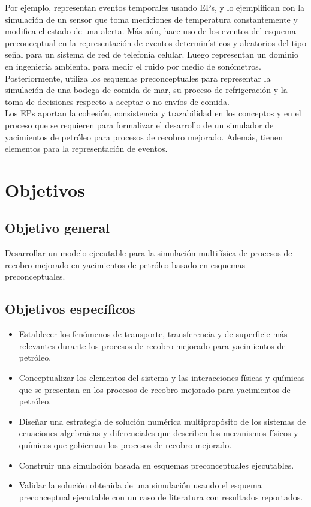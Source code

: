 Por ejemplo, \cite{norena2018timrep} representan eventos temporales usando EPs, y lo ejemplifican con la simulación de un sensor que toma mediciones de temperatura constantemente y modifica el estado de una alerta. Más aún, \cite{norena2018det} hace uso de los eventos del esquema preconceptual en la representación de eventos determinísticos y aleatorios del tipo señal para un sistema de red de telefonía celular. Luego \cite{norena2018ruido} representan un dominio en ingeniería ambiental para medir el ruido por medio de sonómetros. Posteriormente, \cite{norena2018bs} utiliza los esquemas preconceptuales para representar la simulación de una bodega de comida de mar, su proceso de refrigeración y la toma de decisiones respecto a aceptar o no envíos de comida.\\

Los EPs aportan la cohesión, consistencia y trazabilidad en los conceptos y en el proceso que se requieren para formalizar el desarrollo de un simulador de yacimientos de petróleo para procesos de recobro mejorado. Además, tienen elementos para la representación de eventos. %

\section{Objetivos}
\subsection{Objetivo general}
Desarrollar un modelo ejecutable para la simulación multifísica de procesos de recobro mejorado en yacimientos de petróleo basado en esquemas preconceptuales.
\subsection{Objetivos específicos}
\begin{itemize}
	\item Establecer los fenómenos de transporte, transferencia y de superficie más relevantes durante los procesos de recobro mejorado para yacimientos de petróleo.
	\item Conceptualizar los elementos del sistema y las interacciones físicas y químicas que se presentan en los procesos de recobro mejorado para yacimientos de petróleo.
	\item Diseñar una estrategia de solución numérica multipropósito de los sistemas de ecuaciones algebraicas y diferenciales que describen los mecanismos físicos y químicos que gobiernan los procesos de recobro mejorado.
	\item Construir una simulación basada en esquemas preconceptuales ejecutables.
	\item Validar la solución obtenida de una simulación usando el esquema preconceptual ejecutable con un caso de literatura con resultados reportados.
\end{itemize}